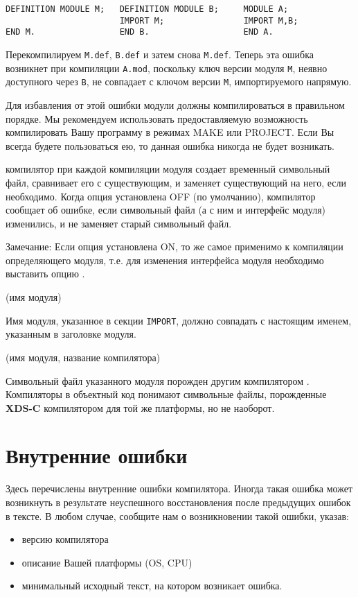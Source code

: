 \begin{verbatim}
DEFINITION MODULE M;   DEFINITION MODULE B;     MODULE A;
                       IMPORT M;                IMPORT M,B;
END M.                 END B.                   END A.
\end{verbatim}

Перекомпилируем \verb'M.def', \verb'B.def' и затем снова \verb'M.def'.
Теперь эта ошибка возникнет при компиляции
\verb'A.mod', поскольку ключ версии модуля 
\verb'M', неявно доступного через \verb'B',
не совпадает с ключом версии \verb'M', импортируемого напрямую.

Для избавления от этой ошибки модули должны компилироваться в
правильном порядке. Мы рекомендуем использовать предоставляемую
\xds{} возможность компилировать Вашу программу в режимах
MAKE или PROJECT. Если Вы всегда будете пользоваться ею, то 
данная ошибка никогда не будет возникать.


\ot{} компилятор при каждой компиляции модуля создает временный 
символьный файл, сравнивает его с существующим, и заменяет существующий
на него, если необходимо.
Когда опция  установлена OFF (по умолчанию), компилятор 
сообщает об ошибке, если символьный файл (а с ним и интерфейс модуля)
изменились, и не заменяет старый символьный файл.

Замечание: Если опция  установлена ON, то же самое применимо
к компиляции \mt{} определяющего модуля, т.е. для изменения 
интерфейса модуля необходимо выставить опцию
.

(имя модуля)

Имя модуля, указанное в секции \verb'IMPORT', должно совпадать 
с настоящим именем, указанным в заголовке модуля.

(имя модуля, название компилятора)

Символьный файл указанного модуля порожден другим  компилятором \xds{}.
Компиляторы в объектный код понимают символьные файлы, порожденные
{\bf XDS-C} компилятором для той же платформы, но не наоборот.

\section{Внутренние ошибки}

Здесь перечислены внутренние ошибки компилятора. Иногда такая
ошибка может возникнуть в результате неуспешного восстановления
после предыдущих ошибок в тексте. В любом случае, 
сообщите нам о возникновении такой ошибки, указав:
\begin{itemize}
\item версию компилятора
\item описание Вашей платформы (OS, CPU)
\item минимальный исходный текст, на котором возникает ошибка.
\end{itemize}

